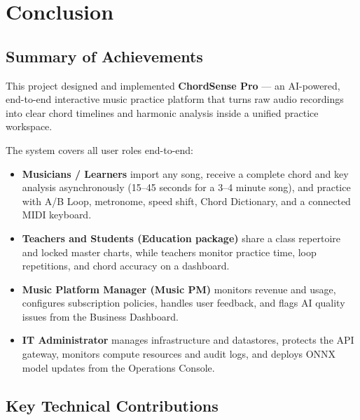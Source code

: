 \documentclass[a4paper]{article}
\begin{document}
\newpage
\section*{Conclusion}

\subsection*{Summary of Achievements}

This project designed and implemented \textbf{ChordSense Pro} --- an AI-powered, end-to-end interactive music practice platform that turns raw audio recordings into clear chord timelines and harmonic analysis inside a unified practice workspace.

The system covers all user roles end-to-end:
\begin{itemize}
    \item \textbf{Musicians / Learners} import any song, receive a complete chord and key analysis asynchronously (15--45 seconds for a 3--4 minute song), and practice with A/B Loop, metronome, speed shift, Chord Dictionary, and a connected MIDI keyboard.
    \item \textbf{Teachers and Students (Education package)} share a class repertoire and locked master charts, while teachers monitor practice time, loop repetitions, and chord accuracy on a dashboard.
    \item \textbf{Music Platform Manager (Music PM)} monitors revenue and usage, configures subscription policies, handles user feedback, and flags AI quality issues from the Business Dashboard.
    \item \textbf{IT Administrator} manages infrastructure and datastores, protects the API gateway, monitors compute resources and audit logs, and deploys ONNX model updates from the Operations Console.
\end{itemize}

\subsection*{Key Technical Contributions}
\end{document}
